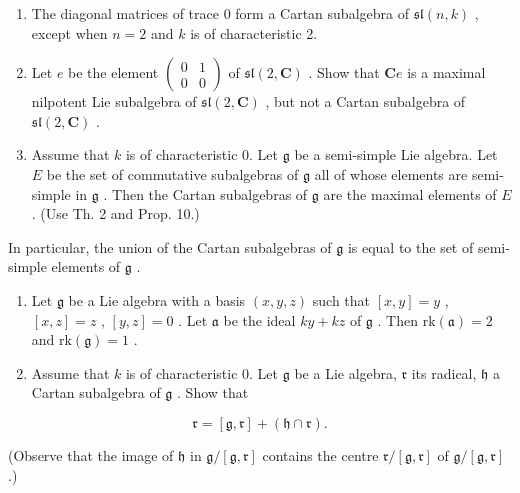 
\begin{enumerate}
\def\labelenumi{\arabic{enumi})}
\item
  The diagonal matrices of trace 0 form a Cartan subalgebra of \(\mathfrak{sl}(n,k)\) , except when \(n = 2\) and \(k\) is of characteristic 2.
\item
  Let \(e\) be the element \(\begin{pmatrix} 0 & 1 \\ 0 & 0 \end{pmatrix}\) of \(\mathfrak{sl}(2, \mathbf{C})\) . Show that \(\mathbf{C}e\) is a maximal nilpotent Lie subalgebra of \(\mathfrak{sl}(2, \mathbf{C})\) , but not a Cartan subalgebra of \(\mathfrak{sl}(2, \mathbf{C})\) .
\item
  Assume that \(k\) is of characteristic 0. Let \(\mathfrak{g}\) be a semi-simple Lie algebra. Let \(E\) be the set of commutative subalgebras of \(\mathfrak{g}\) all of whose elements are semi-simple in \(\mathfrak{g}\) . Then the Cartan subalgebras of \(\mathfrak{g}\) are the maximal elements of \(E\) . (Use Th. 2 and Prop. 10.)
\end{enumerate}

In particular, the union of the Cartan subalgebras of \(\mathfrak{g}\) is equal to the set of semi-simple elements of \(\mathfrak{g}\) .

\begin{enumerate}
\def\labelenumi{\arabic{enumi})}
\setcounter{enumi}{3}
\item
  Let \(\mathfrak{g}\) be a Lie algebra with a basis \((x,y,z)\) such that \([x,y] = y\) , \([x,z] = z\) , \([y,z] = 0\) . Let \(\mathfrak{a}\) be the ideal \(ky + kz\) of \(\mathfrak{g}\) . Then \(\mathrm{rk}(\mathfrak{a}) = 2\) and \(\mathrm{rk}(\mathfrak{g}) = 1\) .
\item
  Assume that \(k\) is of characteristic 0. Let \(\mathfrak{g}\) be a Lie algebra, \(\mathfrak{r}\) its radical, \(\mathfrak{h}\) a Cartan subalgebra of \(\mathfrak{g}\) . Show that
\end{enumerate}

\[
\mathfrak {r} = [ \mathfrak {g}, \mathfrak {r} ] + (\mathfrak {h} \cap \mathfrak {r}).
\]

(Observe that the image of \(\mathfrak{h}\) in \(\mathfrak{g}/[\mathfrak{g},\mathfrak{r}]\) contains the centre \(\mathfrak{r}/[\mathfrak{g},\mathfrak{r}]\) of \(\mathfrak{g}/[\mathfrak{g},\mathfrak{r}]\) .)

